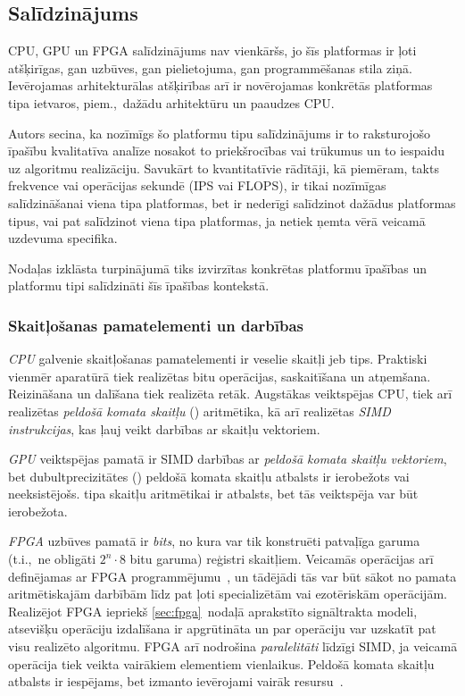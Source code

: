 \subsection{Salīdzinājums} \label{sec:proc-cmp}
CPU, GPU un FPGA salīdzinājums nav vienkāršs, jo šīs platformas ir ļoti
atšķirīgas, gan uzbūves, gan pielietojuma, gan programmēšanas stila ziņā.
Ievērojamas arhitekturālas atšķirības arī ir novērojamas konkrētās
platformas tipa ietvaros, piem.,~dažādu arhitektūru un paaudzes CPU.

Autors secina, ka nozīmīgs šo platformu tipu salīdzinājums ir to
raksturojošo īpašību kvalitatīva analīze nosakot to priekšrocības vai
trūkumus un to iespaidu uz algoritmu realizāciju. Savukārt to
kvantitatīvie rādītāji, kā piemēram, takts frekvence vai operācijas sekundē
(IPS vai FLOPS), ir tikai nozīmīgas salīdzināšanai viena tipa platformas,
bet ir nederīgi salīdzinot dažādus platformas tipus, vai pat salīdzinot viena tipa
platformas, ja netiek ņemta vērā veicamā uzdevuma specifika.

Nodaļas izklāsta turpinājumā tiks izvirzītas konkrētas platformu īpašības un
platformu tipi salīdzināti šīs īpašības kontekstā.

\subsubsection*{Skaitļošanas pamatelementi un darbības}
\emph{CPU} galvenie skaitļošanas pamatelementi ir veselie skaitļi jeb
 tips. Praktiski vienmēr aparatūrā tiek realizētas
bitu operācijas, saskaitīšana un atņemšana.
Reizināšana un dalīšana tiek realizēta retāk. Augstākas veiktspējas CPU,
tiek arī realizētas \emph{peldošā komata skaitļu} ()
aritmētika, kā arī realizētas \emph{SIMD instrukcijas},
kas ļauj veikt darbības ar skaitļu vektoriem.
\cite{Flynn-arch}\cite{Patterson}\cite{SIMD}

\emph{GPU} veiktspējas pamatā ir SIMD darbības ar \emph{peldošā komata
skaitļu vektoriem}, bet dubultprecizitātes ()
peldošā komata skaitļu atbalsts ir ierobežots vai neeksistējošs.
 tipa skaitļu aritmētikai ir atbalsts, bet tās veiktspēja
var būt ierobežota.
\cite{Fatahalian}\cite{Owens-GPU}

\emph{FPGA} uzbūves pamatā ir \emph{bits}, no kura var tik konstruēti
patvaļīga garuma (t.i.,~ne obligāti $2^n \cdot 8$ bitu garuma) reģistri
 skaitļiem. Veicamās operācijas arī definējamas ar FPGA
programmējumu~\cite{JIS}, un tādējādi tās var būt sākot no pamata aritmētiskajām darbībām
līdz pat ļoti specializētām vai ezotēriskām operācijām. Realizējot FPGA
iepriekš \ref{sec:fpga}~nodaļā aprakstīto signāltrakta modeli, atsevišķu
operāciju izdalīšana ir apgrūtināta un par operāciju var uzskatīt pat visu
realizēto algoritmu. FPGA arī nodrošina \emph{paralelitāti} līdzīgi SIMD, ja
veicamā operācija tiek veikta vairākiem elementiem vienlaikus.
Peldošā komata skaitļu atbalsts ir iespējams, bet izmanto ievērojami vairāk
resursu~\cite{FPGA-fp}.

